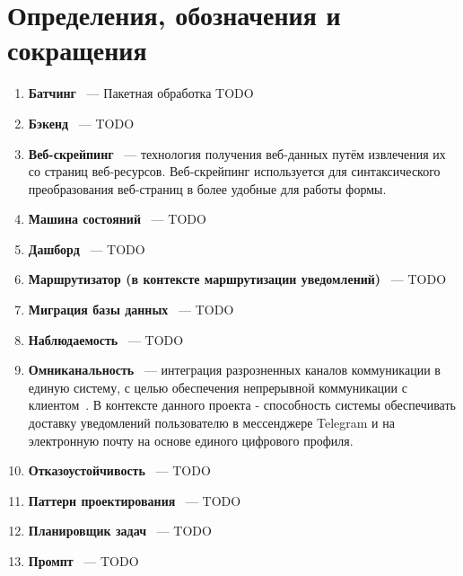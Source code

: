 \section*{Определения, обозначения и сокращения}
\begin{enumerate}
    \item \textbf{Батчинг} ~--- Пакетная обработка  TODO

    \item \textbf{Бэкенд} ~--- TODO
    
    \item \textbf{Веб-скрейпинг} ~--- технология получения веб-данных путём извлечения их со страниц веб-ресурсов.
    Веб-скрейпинг используется для синтаксического преобразования веб-страниц в более удобные для работы формы.
    
    \item \textbf{Машина состояний} ~--- TODO
    
    \item \textbf{Дашборд} ~--- TODO
    
    \item \textbf{Маршрутизатор (в контексте маршрутизации уведомлений)} ~--- TODO
    
    \item \textbf{Миграция базы данных} ~--- TODO
    
    \item \textbf{Наблюдаемость} ~--- TODO
    
    \item \textbf{Омниканальность} ~--- интеграция разрозненных каналов коммуникации в единую систему, с целью обеспечения непрерывной коммуникации с клиентом~\cite{omnichannel_def}.
    В контексте данного проекта - способность системы обеспечивать доставку уведомлений пользователю в мессенджере Telegram и на электронную почту на основе единого цифрового профиля.
    
    \item \textbf{Отказоустойчивость} ~--- TODO
    
    \item \textbf{Паттерн проектирования} ~--- TODO
    
    \item \textbf{Планировщик задач} ~--- TODO
    
    \item \textbf{Промпт} ~--- TODO
    

\end{enumerate}

